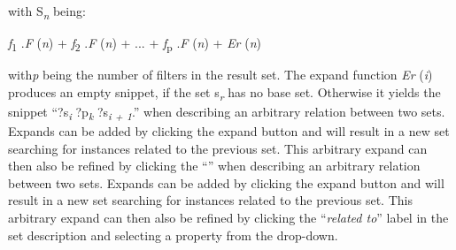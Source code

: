 \documentclass{sig-alternate}
\begin{document}
with S\textsubscript{{\em n}} being:

{\em f}\textsubscript{1} .{\em F} ({\em n}) + {\em f}\textsubscript{2} .{\em F} ({\em n}) + ... + {\em f}\textsubscript{p} .{\em F} ({\em n}) + {\em Er} ({\em n})

with{\em  p} being the number of ﬁlters in the result set. The expand function {\em Er} ({\em i}) produces an empty snippet, if the set s\textsubscript{{\em r}} has no base set. Otherwise it yields the snippet ``?s\textsubscript{{\em i}} ?p\textsubscript{{\em k}} ?s\textsubscript{{\em i + 1}}.'' when describing an arbitrary relation between two sets. Expands can be added by clicking the expand button and will result in a new set searching for instances related to the previous set. This arbitrary expand can then also be reﬁned by clicking the ``'' when describing an arbitrary relation between two sets. Expands can be added by clicking the expand button and will result in a new set searching for instances related to the previous set. This arbitrary expand can then also be reﬁned by clicking the ``{\em related to}'' label in the set description and selecting a property from the drop-down.
\end{document}
